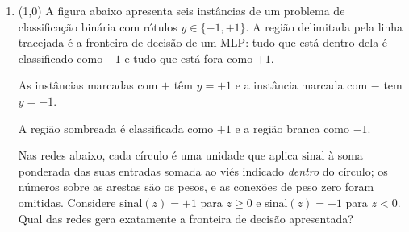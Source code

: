\documentclass[11pt,a4paper]{article}
\begin{document}
\begin{enumerate}[1)]
\setlength{\itemsep}{1em}

\item (1{,}0) A figura abaixo apresenta seis instâncias de um problema de classificação binária com rótulos $y \in \{-1, +1\}$. A região delimitada pela linha tracejada é a fronteira de decisão de um MLP: tudo que está dentro dela é classificado como $-1$ e tudo que está fora como $+1$.

\begin{center}
\end{center}

\vspace{-0.7em}
\centerline{\footnotesize As instâncias marcadas com $+$ têm $y = +1$ e a instância marcada com $-$ tem $y = -1$.}
\centerline{\footnotesize A região sombreada é classificada como $+1$ e a região branca como $-1$.}

Nas redes abaixo, cada círculo é uma unidade que aplica $\mathrm{sinal}$ à soma ponderada das suas entradas somada ao viés indicado \emph{dentro} do círculo; os números sobre as arestas são os pesos, e as conexões de peso zero foram omitidas. Considere $\mathrm{sinal}(z) = +1$ para $z \geq 0$ e $\mathrm{sinal}(z) = -1$ para $z < 0$. Qual das redes gera exatamente a fronteira de decisão apresentada?


\end{enumerate}
\end{document}
